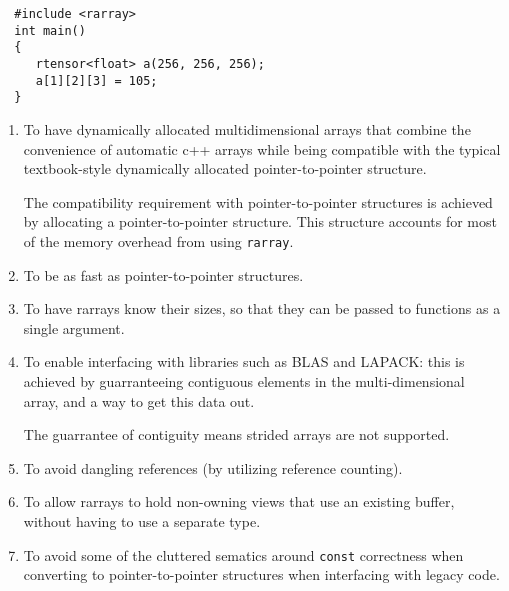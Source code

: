 \documentclass[11pt,twoside]{article}
\begin{document}
\begin{framed}\vspace{-14pt}%
\begin{verbatim}
  #include <rarray>
  int main() 
  {
     rtensor<float> a(256, 256, 256);
     a[1][2][3] = 105;
  }
\end{verbatim}%
\vspace{-14pt}%
\end{framed}


\begin{enumerate}\itemsep1pt\parskip3pt
 
\item To have dynamically allocated multidimensional arrays that
combine the convenience of automatic c++ arrays while being compatible
with the
typical textbook-style dynamically allocated pointer-to-pointer
structure. 

The compatibility requirement with pointer-to-pointer structures
is achieved by allocating a pointer-to-pointer structure. This
structure accounts for most of the memory overhead from using \texttt{rarray}.

\item To be as fast as pointer-to-pointer structures.

\item To have rarrays know their sizes, so that they can be passed to
functions as a single argument. 

\item To enable interfacing with libraries such as BLAS and LAPACK: this
  is achieved by guarranteeing contiguous elements in the
  multi-dimensional array, and a way to get this data out.

  The guarrantee of contiguity means strided arrays are not supported.

\item To avoid dangling references (by utilizing reference counting).


\item To allow rarrays to hold non-owning views that use an existing buffer,
  without having to use a separate type.

\item To avoid some of the cluttered sematics around \texttt{const}
  correctness when converting to pointer-to-pointer structures when
  interfacing with legacy code.

\end{enumerate}
\end{document}

